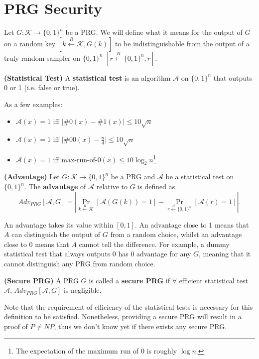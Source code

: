 \section{PRG Security}
Let $G:\mathcal{K}\rightarrow\{0,1\}^n$ be a PRG. We will define what it means for the output of $G$ on a random key $\left[k\xleftarrow{R}\mathcal{K}, G(k)\right]$ to be indistinguishable from the output of a truly random sampler on $\{0,1\}^n$ $\left[r\xleftarrow{R}\{0,1\}^n, r\right]$.
\begin{definition}\textbf{(Statistical Test)}
A \textbf{statistical test} is an algorithm $\mathcal{A}$ on $\{0,1\}^n$ that outputs 0 or 1 (i.e. false or true). 
\end{definition}
As a few examples:
\begin{itemize}
\item $\mathcal{A}(x)=1$ iff $\lvert\#0(x)-\#1(x)\rvert\leq 10\sqrt{n}$
\item $\mathcal{A}(x)=1$ iff $\lvert\#00(x)-\frac{n}{4}\rvert\leq 10\sqrt{n}$
\item $\mathcal{A}(x)=1$ iff $\text{max-run-of-0}(x)\leq 10\log_2{n}$\footnote{The expectation of the maximum run of 0 is roughly $\log n$.}
\end{itemize}
\begin{definition}\textbf{(Advantage)}
Let $G:\mathcal{K}\rightarrow\{0,1\}^n$ be a PRG and $\mathcal{A}$ be a statistical test on $\{0,1\}^n$. The \textbf{advantage} of $\mathcal{A}$ relative to $G$ is defined as 
\[Adv_{PRG}[\mathcal{A},G]=\left\lvert\mathop{Pr}\limits_{k\xleftarrow{R}\mathcal{K}}[\mathcal{A}(G(k))=1]-\mathop{Pr}\limits_{r\xleftarrow{R}\{0,1\}^n}[\mathcal{A}(r)=1]\right\rvert.\]
\end{definition}
An advantage takes its value within $[0,1]$. An advantage close to 1 means that $A$ can distinguish the output of $G$ from a random choice, whilst an advantage close to 0 means that $A$ cannot tell the difference. For example, a dummy statistical test that always outputs 0 has 0 advantage for any $G$, meaning that it cannot distinguish any PRG from random choice. 
\begin{definition}\textbf{(Secure PRG)}
A PRG $G$ is called a \textbf{secure PRG} if $\forall$ efficient statistical test  $\mathcal{A}$, $Adv_{PRG}[\mathcal{A},G]$ is negligible.
\end{definition}
Note that the requirement of efficiency of the statistical tests is necessary for this definition to be satisfied. Nonetheless, providing a secure PRG will result in a proof of $P\neq NP$, thus we don't know yet if there exists any secure PRG. 
